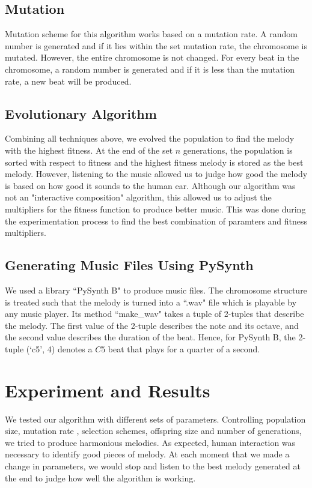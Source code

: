 \documentclass[conference]{IEEEtran}
\begin{document}
\subsection{Mutation}
Mutation scheme for this algorithm works based on a mutation rate. A random number is generated and if it lies within the set mutation rate, the chromosome is mutated. However, the entire chromosome is not changed. For every beat in the chromosome, a random number is generated and if it is less than the mutation rate, a new beat will be produced.

\subsection{Evolutionary Algorithm}
Combining all techniques above, we evolved the population to find the melody with the highest fitness. At the end of the set $n$ generations, the population is sorted with respect to fitness and the highest fitness melody is stored as the best melody. However, listening to the music allowed us to judge how good the melody is based on how good it sounds to the human ear. Although our algorithm was not an "interactive composition" algorithm, this allowed us to adjust the multipliers for the fitness function to produce better music. This was done during the experimentation process to find the best combination of paramters and fitness multipliers.

\subsection{Generating Music Files Using PySynth}
We used a library ``PySynth B" to produce music files. The chromosome structure is treated such that the melody is turned into a ``.wav" file which is playable by any music player. Its method ``make\_wav" takes a tuple of 2-tuples that describe the melody. The first value of the 2-tuple describes the note and its octave, and the second value describes the duration of the beat. Hence, for PySynth B, the 2-tuple (`c5', 4) denotes a $C5$ beat that plays for a quarter of a second.


\section{Experiment and Results}
We tested our algorithm with different sets of parameters. Controlling population size, mutation rate , selection schemes, offspring size and number of generations, we tried to produce harmonious melodies. As expected, human interaction was necessary to identify good pieces of melody. At each moment that we made a change in parameters, we would stop and listen to the best melody generated at the end to judge how well the algorithm is working.
\end{document}
